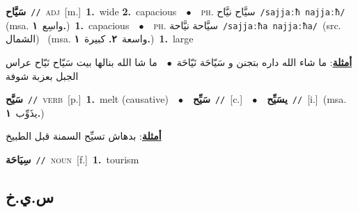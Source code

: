 \documentclass[10pt,a4paper,twoside]{article} %
\begin{document}
\begin{multicols}{2}
{\setlength\topsep{0pt}\textbf{\foreignlanguage{arabic}{سَيَّاح}}\ {\color{gray}\texttt{//}\color{black}}\ \textsc{adj}\ [m.]\ \textbf{1.}~wide  \textbf{2.}~capacious\ \ $\bullet$\ \ \textsc{ph.} \color{gray} \foreignlanguage{arabic}{سيَّاح نيَّاح}\color{black}\ {\color{gray}\texttt{/{\sffamily sajjaːħ najjaːħ}/}\color{black}}\ \color{gray} (msa. \foreignlanguage{arabic}{واسِع}~\foreignlanguage{arabic}{\textbf{١.}})\color{black}\ \textbf{1.}~capacious\ \ $\bullet$\ \ \textsc{ph.} \color{gray} \foreignlanguage{arabic}{سيَّاحة نيَّاحة}\color{black}\ {\color{gray}\texttt{/{\sffamily sajjaːħa najjaːħa}/}\color{black}}\ \color{gray}(src. \foreignlanguage{arabic}{الشمال})\color{black}\ \color{gray} (msa. \foreignlanguage{arabic}{واسعة}~\foreignlanguage{arabic}{\textbf{٢.}}  \foreignlanguage{arabic}{كبيرة}~\foreignlanguage{arabic}{\textbf{١.}})\color{black}\ \textbf{1.}~large\  \begin{flushright}\color{gray}\foreignlanguage{arabic}{\textbf{\underline{\foreignlanguage{arabic}{أمثلة}}}: ما شاء الله داره بتجنن و سَيّاحَة نَيّاحَة\ $\bullet$\ \  ما شا الله بنالها بيت سَيّاح نَيّاح عراس الجبل بعزبة شوفة}\end{flushright}\color{black}} \vspace{2mm}

{\setlength\topsep{0pt}\textbf{\foreignlanguage{arabic}{سَيَّح}}\ {\color{gray}\texttt{//}\color{black}}\ \textsc{verb}\ [p.]\ \textbf{1.}~melt (causative)\ \ $\bullet$\ \ \setlength\topsep{0pt}\textbf{\foreignlanguage{arabic}{سَيِّح}}\ {\color{gray}\texttt{//}\color{black}}\ [c.]\ \ $\bullet$\ \ \setlength\topsep{0pt}\textbf{\foreignlanguage{arabic}{يسَيِّح}}\ {\color{gray}\texttt{//}\color{black}}\ [i.]\ \color{gray}(msa. \foreignlanguage{arabic}{يذَوِّب}~\foreignlanguage{arabic}{\textbf{١.}})\color{black}\  \begin{flushright}\color{gray}\foreignlanguage{arabic}{\textbf{\underline{\foreignlanguage{arabic}{أمثلة}}}: بدهاش تسيِّح السمنة قبل الطبيخ}\end{flushright}\color{black}} \vspace{2mm}

{\setlength\topsep{0pt}\textbf{\foreignlanguage{arabic}{سِيَاحَة}}\ {\color{gray}\texttt{//}\color{black}}\ \textsc{noun}\ [f.]\ \textbf{1.}~tourism\ } \vspace{2mm}

\vspace{-3mm}
\subsection*{\color{blue}\foreignlanguage{arabic}{س.ي.خ}\color{blue}{}} 


\end{multicols}
\end{document}
